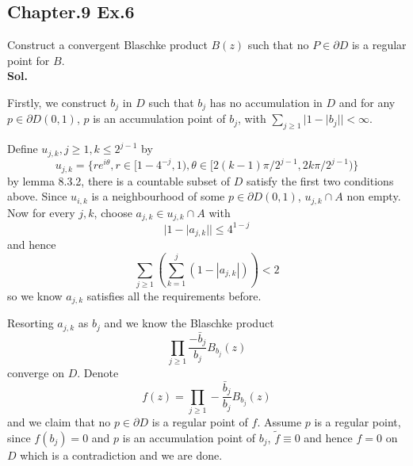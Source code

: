 \documentclass[lang=en,11pt,a4paper,citestyle =authoryear]{elegantpaper}
\begin{document}
\subsection*{Chapter.9 Ex.6} 
Construct a convergent Blaschke product $B(z)$ such that no $P\in\partial D$ is a regular point for $B$.
\vspace{0.5em}\\
\textbf{Sol.} \par
Firstly, we construct $b_j$ in $D$ such that $b_j$ has no accumulation in $D$ and for any $p\in\partial D(0,1)$, $p$ is an accumulation point of $b_j$, with $\sum_{j\geq 1} |1-|b_j|| < \infty$.\par
Define $u_{j,k}, j\geq 1, k \leq 2^{j-1}$ by
\[u_{j,k} = \{re^{i\theta}, r\in [1-4^{-j},1), \theta \in [2(k-1)\pi/2^{j-1},2k\pi/2^{j-1})\}\]
by lemma 8.3.2, there is a countable subset of $D$ satisfy the first two conditions above. Since $u_{i,k}$ is a neighbourhood of some $p\in \partial D(0,1)$, $u_{j,k}\cap A$ non empty. Now for every $j,k$, choose $a_{j,k}\in u_{j,k}\cap A$ with
\[|1-|a_{j,k}|| \leq 4^{1-j}\]
and hence
\[
\sum_{j\geq 1}(\sum\limits_{k=1}^j (1-|a_{j,k}|)) < 2
\]
so we know $a_{j,k}$ satisfies all the requirements before.\par
Resorting $a_{j,k}$ as $b_j$ and we know the Blaschke product
\[\prod_{j\geq 1}\dfrac{-\bar{b}_j}{b_j}B_{b_j}(z)\]
converge on $D$. Denote
\[f(z) = \prod_{j\geq 1}-\dfrac{\bar{b}_j}{b_j}B_{b_j}(z)\]
and we claim that no $p\in\partial D$ is a regular point of $f$. Assume $p$ is a regular point, since $f(b_j) = 0$ and $p$ is an accumulation point of $b_j$, $\tilde{f} \equiv 0$ and hence $f = 0$ on $D$ which is a contradiction and we are done. 
\vspace{0.5em}
\end{document}

